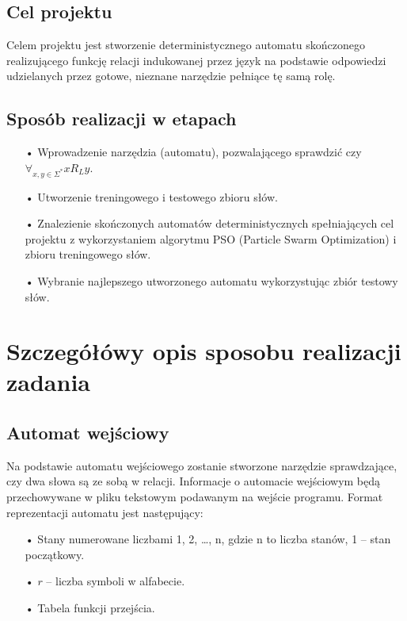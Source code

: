 \documentclass{llncs}
\begin{document}
\subsection{Cel projektu}

Celem projektu jest stworzenie deterministycznego automatu skończonego realizującego funkcję relacji indukowanej przez język na podstawie odpowiedzi udzielanych przez gotowe, nieznane narzędzie pełniące tę samą rolę.

\subsection{Sposób realizacji w etapach}

\begin{itemize}
\item[•] Wprowadzenie narzędzia (automatu), pozwalającego sprawdzić czy $\forall_{x,y \in \Sigma^*} x R_{L} y$.
\item[•] Utworzenie treningowego i testowego zbioru słów.
\item[•] Znalezienie skończonych automatów deterministycznych spełniających cel projektu z wykorzystaniem algorytmu PSO (Particle Swarm Optimization) i zbioru treningowego słów.
\item[•] Wybranie najlepszego utworzonego automatu wykorzystując zbiór testowy słów.
\end{itemize}

\newpage

\section{Szczegółówy opis sposobu realizacji zadania}

\subsection{Automat wejściowy}

Na podstawie automatu wejściowego zostanie stworzone narzędzie sprawdzające, czy dwa słowa są ze sobą w relacji. Informacje o automacie wejściowym będą przechowywane w pliku tekstowym podawanym na wejście programu. Format reprezentacji automatu jest następujący:

\begin{itemize}
\item[•] Stany numerowane liczbami 1, 2, …, n, gdzie n to liczba stanów, 1 – stan początkowy.
\item[•] $r$ – liczba symboli w alfabecie.
\item[•] Tabela funkcji przejścia.
\end{itemize}
\end{document}
